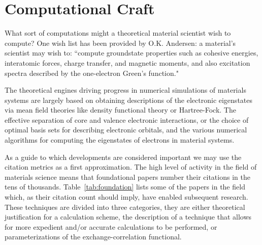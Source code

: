 \section{Computational Craft}
What sort of computations might a theoretical material scientist
wish to compute? One wish list has been provided by O.K. Andersen:
a material's scientist may wish to:
``compute groundstate properties such as cohesive energies, interatomic forces, 
charge transfer, and magnetic moments, and also excitation spectra described 
by the one-electron Green's function."\cite{anderson75} 

The theoretical engines driving progress in numerical simulations of materials systems are
largely based on obtaining descriptions of the electronic eigenstates via mean field theories
like density functional theory or Hartree-Fock. The effective separation
of core and valence electronic interactions, or the choice of optimal basis sets for
describing electronic orbitals, and the various numerical algorithms for 
computing the eigenstates of electrons in material systems.

As a guide to which developments are considered important we may
use the citation metrics as a first approximation. The high level of activity in the field of materials science 
means that foundational papers number their citations in the tens of thousands. 
Table~\ref{tab:foundation} lists some of the papers in the field which, as
their citation count should imply, have enabled subsequent research. These techniques are divided into
three categories, they are either theoretical justification for a calculation scheme, the description of
a technique that allows for more expedient and/or accurate calculations to be performed, 
or parameterizations of the exchange-correlation functional.

